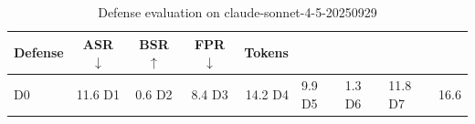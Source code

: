 \begin{table}[t]
\centering
\small
\begin{tabular}{l c c c r}
\toprule
Defense & ASR $\downarrow$ & BSR $\uparrow$ & FPR $\downarrow$ & Tokens \\
\midrule
D0 & 11.6%
D1 & 0.6%
D2 & 8.4%
D3 & 14.2%
D4 & 9.9%
D5 & 1.3%
D6 & 11.8%
D7 & 16.6%
\bottomrule
\end{tabular}
\caption{Defense evaluation on claude-sonnet-4-5-20250929}
\label{tab:results_claude_sonnet_4_5_20250929}
\end{table}